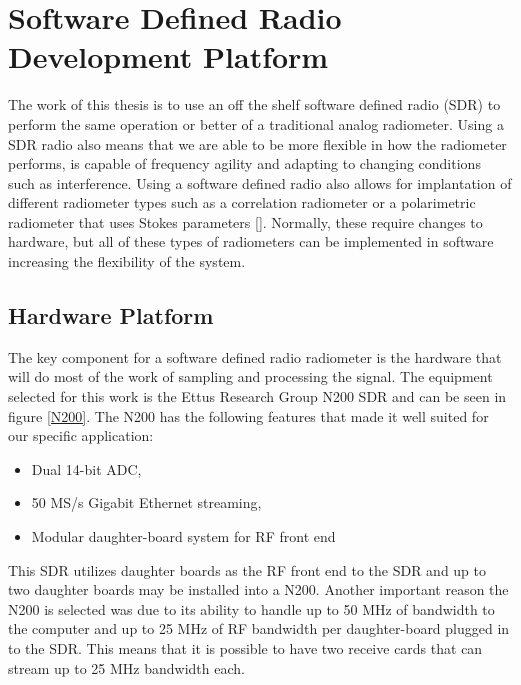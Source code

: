 \section{Software Defined Radio Development Platform} \label{SDR_platform}
The work of this thesis is to use an off the shelf software defined radio (SDR) to perform the same operation or better of a traditional analog radiometer.  Using a SDR radio also means that we are able to be more flexible in how the radiometer performs, is capable of frequency agility and adapting to changing conditions such as interference.  Using a software defined radio also allows for implantation of different radiometer types such as a correlation radiometer or a polarimetric radiometer that uses Stokes parameters [\cite{Wang}].  Normally, these require changes to hardware, but all of these types of radiometers can be implemented in software increasing the flexibility of the system.  

\subsection{Hardware Platform}
The key component for a software defined radio radiometer is the hardware that will do most of the work of sampling and processing the signal.  The equipment selected for this work is the Ettus Research Group N200 SDR and can be seen in figure \ref{N200}.  The N200 has the following features that made it well suited for our specific application:

\begin{itemize}
\item Dual 14-bit ADC,
\item 50 MS/s Gigabit Ethernet streaming,
\item Modular daughter-board system for RF front end
\end{itemize}

This SDR utilizes daughter boards as the RF front end to the SDR and up to two daughter boards may be installed into a N200.  Another important reason the N200 is selected was due to its ability to handle up to 50 MHz of bandwidth to the computer and up to 25 MHz of RF bandwidth per daughter-board plugged in to the SDR.  This means that it is possible to have two receive cards that can stream up to 25 MHz bandwidth each.

